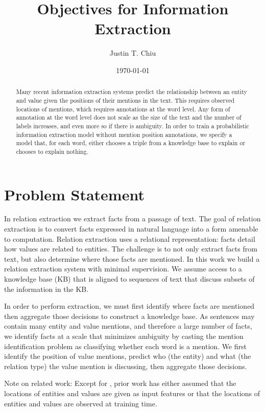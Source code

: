 \documentclass[12pt]{article}
\title{Objectives for Information Extraction}
\author{
Justin T. Chiu
}
\date{\today}
\begin{document}
\maketitle

\begin{abstract}
Many recent information extraction systems predict the relationship between
an entity and value given the positions of their mentions in the text.
This requires observed locations of mentions, which requires annotations at the word level.
Any form of annotation at the word level does not scale as the size of the text
and the number of labels increases, and even more so if there is ambiguity.
In order to train a probabilistic information extraction model without mention
position annotations, we specify a model that, for each word,
either chooses a triple from a knowledge base to explain or chooses to explain nothing.
\end{abstract}

\section{Problem Statement}

In relation extraction we extract facts from a passage of text.
The goal of relation extraction is to convert facts expressed in natural language into a form
amenable to computation.
Relation extraction uses a relational representation: facts detail
how values are related to entities.
The challenge is to not only extract facts from text, but also
determine where those facts are mentioned.
In this work we build a relation extraction system with minimal supervision.
We assume access to a knowledge base (KB) that is aligned to sequences of text
that discuss subsets of the information in the KB.

In order to perform extraction, we must first identify where facts are mentioned
then aggregate those decisions to construct a knowledge base.
As sentences may contain many entity and value mentions, and therefore 
a large number of facts, we identify facts at a scale that minimizes ambiguity
by casting the mention identification problem as classifying whether each word is a mention.
We first identify the position of value mentions,
predict who (the entity) and what (the relation type) the value mention
is discussing, then aggregate those decisions.

Note on related work:
Except for \citet{zeng2018copy}, prior work has either assumed that the locations of
entities and values are given as input features or that the locations of entities and values
are observed at training time.
\end{document}
